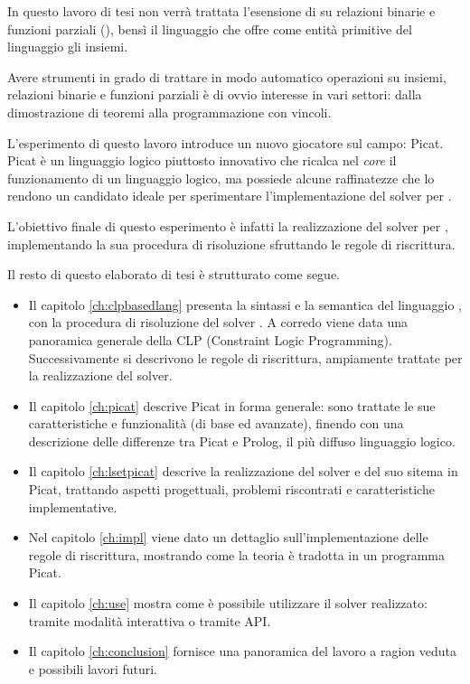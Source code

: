 \documentclass[12pt,a4paper,openright]{book} %
\begin{document}
In questo lavoro di tesi non verrà trattata l'esensione di \clpset{}
su relazioni binarie e funzioni parziali (\lbr{}), bensì il linguaggio
\lset{} che offre come entità primitive del linguaggio gli insiemi.

Avere strumenti in grado di trattare in modo automatico operazioni su
insiemi, relazioni binarie e funzioni parziali è di ovvio interesse in
vari settori: dalla dimostrazione di teoremi alla programmazione con
vincoli.

L'esperimento di questo lavoro introduce un nuovo giocatore sul campo:
Picat. Picat è un linguaggio logico piuttosto innovativo che ricalca
nel \textit{core} il funzionamento di un linguaggio logico, ma
possiede alcune raffinatezze che lo rendono un candidato ideale per
sperimentare l'implementazione del solver per \lset{}.

L'obiettivo finale di questo esperimento è infatti la realizzazione
del solver \satset{} per \lset{}, implementando la sua procedura di
risoluzione sfruttando le regole di riscrittura.

\bigskip

\noindent Il resto di questo elaborato di tesi è strutturato come
segue.
\begin{itemize}
	\item Il capitolo \ref{ch:clpbasedlang} presenta la sintassi e
          la semantica del linguaggio \lset{}, con la procedura di
          risoluzione del solver \satset{}. A corredo viene data una
          panoramica generale della CLP (Constraint Logic
          Programming). Successivamente si descrivono le regole di
          riscrittura, ampiamente trattate per la realizzazione del
          solver.
	\item Il capitolo \ref{ch:picat} descrive Picat in forma
          generale: sono trattate le sue caratteristiche e
          funzionalità (di base ed avanzate), finendo con una
          descrizione delle differenze tra Picat e Prolog, il più
          diffuso linguaggio logico.
	\item Il capitolo \ref{ch:lsetpicat} descrive la realizzazione
          del solver e del suo sitema in Picat, trattando aspetti
          progettuali, problemi riscontrati e caratteristiche
          implementative.
	\item Nel capitolo \ref{ch:impl} viene dato un dettaglio
          sull'implementazione delle regole di riscrittura, mostrando
          come la teoria è tradotta in un programma Picat.
	\item Il capitolo \ref{ch:use} mostra come è possibile
          utilizzare il solver realizzato: tramite modalità
          interattiva o tramite API.
	\item Il capitolo \ref{ch:conclusion} fornisce una panoramica
          del lavoro a ragion veduta e possibili lavori futuri.
\end{itemize}
\end{document}
